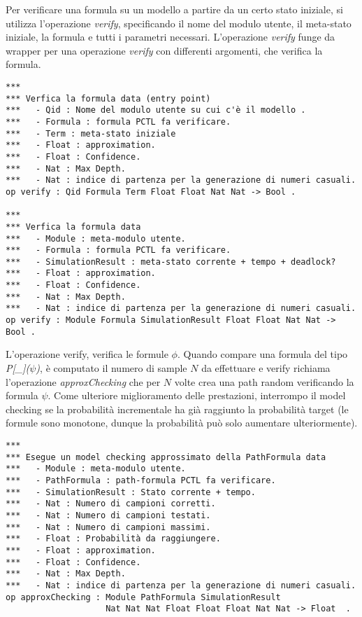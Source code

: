 Per verificare una formula su un modello a partire da un certo stato
iniziale, si utilizza l'operazione \emph{verify}, specificando il nome del
modulo utente, il meta-stato iniziale, la formula e tutti i parametri necessari.
L'operazione \emph{verify} funge da wrapper per una operazione \emph{verify}
con differenti argomenti, che verifica la formula.

\begin{Verbatim}[fontsize=\small]
***
*** Verfica la formula data (entry point)
***   - Qid : Nome del modulo utente su cui c'è il modello .
***   - Formula : formula PCTL fa verificare.
***   - Term : meta-stato iniziale
***   - Float : approximation.
***   - Float : Confidence.
***   - Nat : Max Depth.
***   - Nat : indice di partenza per la generazione di numeri casuali.
op verify : Qid Formula Term Float Float Nat Nat -> Bool .
	
***
*** Verfica la formula data
***   - Module : meta-modulo utente.
***   - Formula : formula PCTL fa verificare.
***   - SimulationResult : meta-stato corrente + tempo + deadlock?
***   - Float : approximation.
***   - Float : Confidence.
***   - Nat : Max Depth.
***   - Nat : indice di partenza per la generazione di numeri casuali.
op verify : Module Formula SimulationResult Float Float Nat Nat -> Bool .
\end{Verbatim}

L'operazione verify, verifica le formule $\phi$. Quando compare una formula del
tipo \emph{P[\_]($\psi$)}, è computato il numero di sample $N$ da
effettuare e verify richiama l'operazione \emph{approxChecking} che per $N$ volte crea una
path random verificando la formula $\psi$. Come ulteriore miglioramento delle
prestazioni, interrompo il model checking se la probabilità incrementale ha già
raggiunto la probabilità target (le formule sono monotone, dunque la
probabilità può solo aumentare ulteriormente).
	
\begin{Verbatim}[fontsize=\small]
***
*** Esegue un model checking approssimato della PathFormula data
***   - Module : meta-modulo utente. 
***   - PathFormula : path-formula PCTL fa verificare.
***   - SimulationResult : Stato corrente + tempo.
***   - Nat : Numero di campioni corretti.
***   - Nat : Numero di campioni testati.
***   - Nat : Numero di campioni massimi.
***   - Float : Probabilità da raggiungere.
***   - Float : approximation.
***   - Float : Confidence.
***   - Nat : Max Depth.
***   - Nat : indice di partenza per la generazione di numeri casuali. 
op approxChecking : Module PathFormula SimulationResult
                    Nat Nat Nat Float Float Float Nat Nat -> Float  .
\end{Verbatim}

